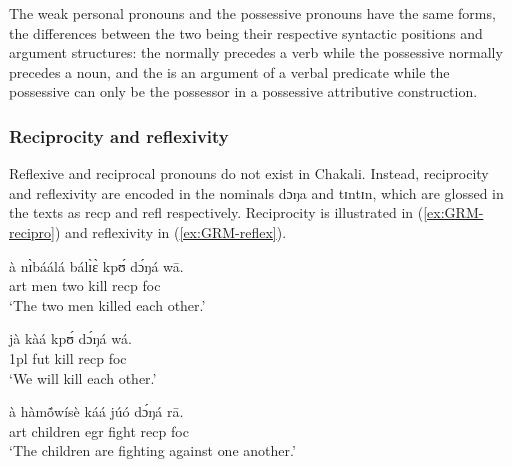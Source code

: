 \begin{exe}
\begin{exe}
\begin{exe}
\begin{exe}
\begin{exe}
\begin{exe}
\begin{exe}
\begin{exe}
\begin{exe}
The  weak personal pronouns and the possessive pronouns have the same forms, the differences between the two being their respective syntactic positions and  argument structures:  the  normally precedes a verb while the
possessive  normally precedes a noun, and the  is an
argument of a verbal predicate while the possessive  can only be the
possessor in a possessive attributive construction. 


% 
% 
% 


\subsubsection{Reciprocity and reflexivity}
\label{sec:GRM-recipro-reflex}


Reflexive and reciprocal pronouns do not exist in Chakali.  Instead, reciprocity and reflexivity  are encoded in  the nominals {\sls dɔŋa}   and {\sls tɪntɪn}, which are glossed in the texts as {\sc recp}  and {\sc refl} respectively.   Reciprocity is illustrated in (\ref{ex:GRM-recipro}) and reflexivity in (\ref{ex:GRM-reflex}). 

  \ea\label{ex:GRM-recipro}
   
   
\ea\label{ex:vp24.1.}
\gll à nɪ̀báálá bálɪ̀ɛ̀ kpʊ́ dɔ́ŋá wā.\\
  {\sc art} men two kill {\sc recp}  {\sc foc}\\
\glt  `The two men killed {\sc each other}.' 

\ex\label{ex:vp24.2.}
\gll jà kàá kpʊ́ dɔ́ŋá wá.\\
   {\sc 1pl} {\sc fut} kill  {\sc recp}   {\sc foc}\\
\glt  `We will kill {\sc each other}.' 

\ex\label{ex:vp24.3.}
\gll à hàmṍwísè káá júó dɔ́ŋá rā.\\
  {\sc art} children {\sc  egr} fight {\sc recp}  {\sc foc}\\
\glt  `The children are fighting against {\sc one another}.' 
 

\end{exe}
\end{exe}
\end{exe}
\end{exe}
\end{exe}
\end{exe}
\end{exe}
\end{exe}
\end{exe}
